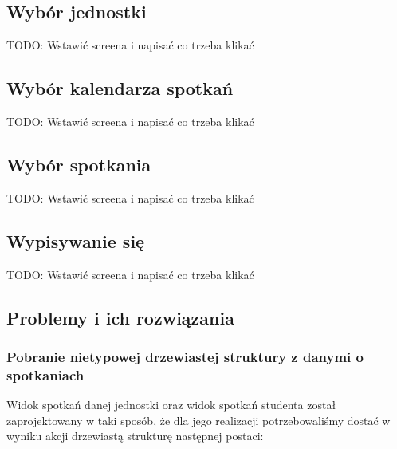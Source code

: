 \documentclass[licencjacka]{pracamgr}
\begin{document}
\subsection{Wybór jednostki}
TODO: Wstawić screena i napisać co trzeba klikać

\subsection{Wybór kalendarza spotkań}
TODO: Wstawić screena i napisać co trzeba klikać

\subsection{Wybór spotkania}
TODO: Wstawić screena i napisać co trzeba klikać

\subsection{Wypisywanie się}
TODO: Wstawić screena i napisać co trzeba klikać

\subsection{Problemy i ich rozwiązania}
\subsubsection{Pobranie nietypowej drzewiastej struktury z danymi o spotkaniach}
Widok spotkań danej jednostki oraz widok spotkań studenta został zaprojektowany w taki sposób, że dla jego realizacji potrzebowaliśmy dostać w wyniku akcji drzewiastą strukturę następnej postaci:
\end{document}
